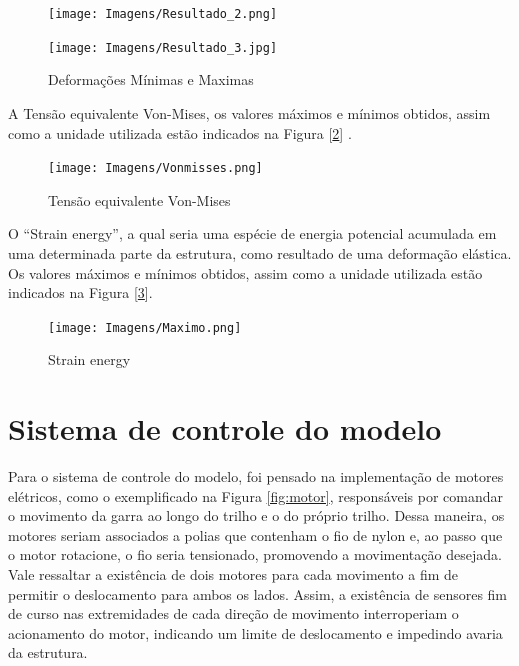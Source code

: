 \documentclass[deposito, acronym, symbols]{fei}
\begin{document}
\begin{figure}[!htp]
  \centering
  \begin{minipage}{0.7\textwidth}
        \caption{Deformações Mínimas e Maximas}
        \texttt{[image: Imagens/Resultado\_2.png]}
        \label{fig:Resultado_2}
  \end{minipage}
  \quad
  \begin{minipage}{0.7\textwidth}
        \texttt{[image: Imagens/Resultado\_3.jpg]}
  \end{minipage}
\end{figure}

\newpage

A Tensão equivalente Von-Mises, os valores máximos e mínimos obtidos, assim como a unidade utilizada estão indicados na Figura [\ref{fig:Vonmisses}] .

\begin{figure}[!htp]
 \centering
    \caption{Tensão equivalente Von-Mises}
    \texttt{[image: Imagens/Vonmisses.png]}
    \label{fig:Vonmisses}
 \end{figure}
 
\newpage

O “Strain energy”, a qual seria uma espécie de energia potencial acumulada em uma determinada parte da estrutura, como resultado de uma deformação elástica. Os valores máximos e mínimos obtidos, assim como a unidade utilizada estão indicados na Figura [\ref{fig:Maximo}].

\begin{figure}[!htb]
 \centering
    \caption{Strain energy}
    \texttt{[image: Imagens/Maximo.png]}
    \label{fig:Maximo}
 \end{figure}
 
\newpage

\chapter{Sistema de controle do modelo} 

Para o sistema de controle do modelo, foi pensado na implementação de motores elétricos, como o exemplificado na Figura \ref{fig:motor}, responsáveis por comandar o movimento da garra ao longo do trilho e o do próprio trilho. Dessa maneira, os motores seriam associados a polias que contenham o fio de nylon e, ao passo que o motor rotacione, o fio seria tensionado, promovendo a movimentação desejada. Vale ressaltar a existência de dois motores para cada movimento a fim de permitir o deslocamento para ambos os lados. Assim, a existência de sensores fim de curso nas extremidades de cada direção de movimento interroperiam o acionamento do motor, indicando um limite de deslocamento e impedindo avaria da estrutura.
\end{document}
